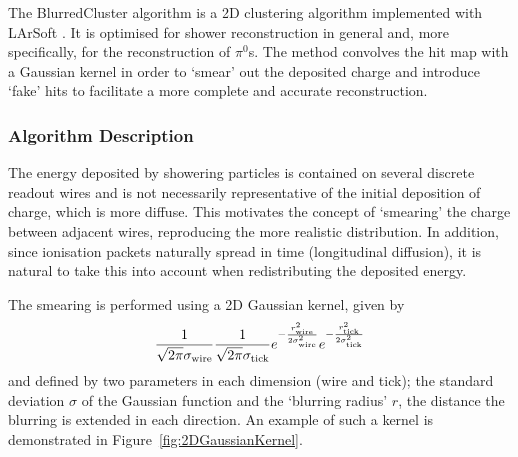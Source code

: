 The BlurredCluster algorithm is a 2D clustering algorithm \cite{KabothThesis} implemented with LArSoft \cite{BlurredCluster,BlurredClusterLArSoft}.  It is optimised for shower reconstruction in general and, more specifically, for the reconstruction of $\pi^0$s.  The method convolves the hit map with a Gaussian kernel in order to `smear' out the deposited charge and introduce `fake' hits to facilitate a more complete and accurate reconstruction.

\subsubsection{Algorithm Description}\label{sec:BlurredClusterDescription}

The energy deposited by showering particles is contained on several discrete readout wires and is not necessarily representative of the initial deposition of charge, which is more diffuse.  This motivates the concept of `smearing' the charge between adjacent wires, reproducing the more realistic distribution.  In addition, since ionisation packets naturally spread in time (longitudinal diffusion), it is natural to take this into account when redistributing the deposited energy.

The smearing is performed using a 2D Gaussian kernel, given by
\begin{equation}\label{eq:2DGaussianKernel}
  \frac{1}{\sqrt{2\pi}\sigma_{\textnormal{wire}}} \frac{1}{\sqrt{2\pi}\sigma_{\textnormal{tick}}} e^{-\frac{r_{\textnormal{wire}}^2}{2\sigma_{\textnormal{wire}}^2}} e^{-\frac{r_{\textnormal{tick}}^2}{2\sigma_{\textnormal{tick}}^2}}
\end{equation}
and defined by two parameters in each dimension (wire and tick); the standard deviation $\sigma$ of the Gaussian function and the `blurring radius' $r$, the distance the blurring is extended in each direction.  An example of such a kernel is demonstrated in Figure~\ref{fig:2DGaussianKernel}.

